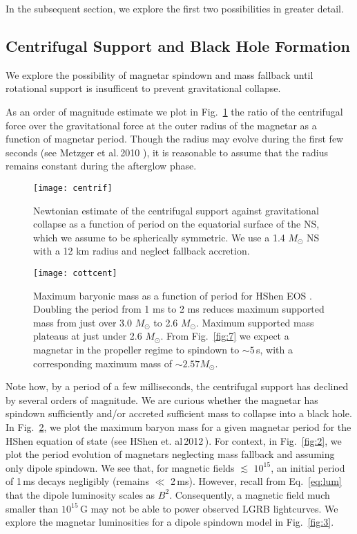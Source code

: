 \documentclass{article}
\begin{document}
In the subsequent section, we explore the first two possibilities in greater detail.

\subsection{Centrifugal Support and Black Hole Formation}\label{sec:magend}

We explore the possibility of magnetar spindown and mass fallback until rotational support is insufficent to prevent gravitational collapse.

As an order of magnitude estimate we plot in Fig.~\ref{fig:1} the ratio of the centrifugal force over the gravitational force at the outer radius of the magnetar as a function of magnetar period. Though the radius may evolve during the first few seconds (see Metzger et al.\,2010 \cite{Metzger:2010pp}), it is reasonable to assume that the radius remains constant during the afterglow phase.

\begin{figure}[h!]
\centering
\texttt{[image: centrif]}
\caption{Newtonian estimate of the centrifugal support against gravitational collapse as a function of period on the equatorial surface of the NS, which we assume to be spherically symmetric. We use a 1.4 $M_{\odot}$ NS with a 12 km radius and neglect fallback accretion.}
\label{fig:1}
\end{figure}

\begin{figure}[h!]
\centering
\texttt{[image: cottcent]}
\caption{Maximum baryonic mass as a function of period for HShen EOS \cite{HShen:2012ap}. Doubling the period from 1 ms to 2 ms reduces maximum supported mass from just over 3.0 $M_{\odot}$ to 2.6 $M_{\odot}$. Maximum supported mass plateaus at just under 2.6 $M_{\odot}$. From Fig.~\ref{fig:7} we expect a magnetar in the propeller regime to spindown to $\sim 5$\,s,  with a corresponding maximum mass of $\sim 2.57 M_{\odot}$.}
\label{fig:0}
\end{figure}

Note how, by a period of a few milliseconds, the centrifugal support has declined by several orders of magnitude. We are curious whether the magnetar has spindown sufficiently and/or accreted sufficient mass to collapse into a black hole. In Fig.~\ref{fig:0}, we plot the maximum baryon mass for a given magnetar period for the HShen equation of state (see HShen et. al\,2012\,\cite{HShen:2012ap}). For context, in Fig.~\ref{fig:2}, we plot the period evolution of magnetars neglecting mass fallback and assuming only dipole spindown. We see that, for magnetic fields $\lesssim$ $10^{15}$, an initial period of 1\,ms decays negligibly (remains $\ll$ 2\,ms). However, recall from Eq.~\ref{eq:lum} that the dipole luminosity scales as $B^{2}$. Consequently, a magnetic field much smaller than $10^{15}$\,G may not be able to power observed LGRB lightcurves. We explore the magnetar luminosities for a dipole spindown model in Fig.~\ref{fig:3}.
\end{document}
